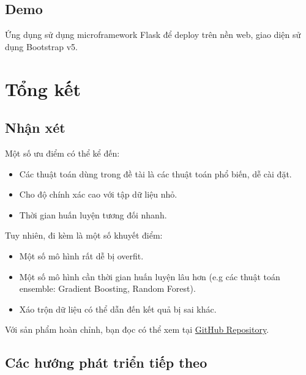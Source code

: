 \documentclass[12pt]{article}
\begin{document}
\subsection{Demo}
Ứng dụng sử dụng microframework Flask để deploy trên nền web, giao diện sử dụng Bootstrap v5.

\section{Tổng kết}
\subsection{Nhận xét}
Một số ưu điểm có thể kể đến:
\begin{itemize}
\item Các thuật toán dùng trong đề tài là các thuật toán phổ biến, dễ cài đặt.
\item Cho độ chính xác cao với tập dữ liệu nhỏ.
\item Thời gian huấn luyện tương đối nhanh.
\end{itemize}
Tuy nhiên, đi kèm là một số khuyết điểm:
\begin{itemize}
\item Một số mô hình rất dễ bị overfit.
\item Một số mô hình cần thời gian huấn luyện lâu hơn (e.g các thuật toán ensemble: Gradient Boosting, Random Forest).
\item Xáo trộn dữ liệu có thể dẫn đến kết quả bị sai khác.\cite{Kowsari_2019}
\end{itemize}
Với sản phẩm hoàn chỉnh, bạn đọc có thể xem tại \href{https://github.com/trhgquan/fakenews-detection}{GitHub Repository}.

\subsection{Các hướng phát triển tiếp theo}

\cleardoublepage
{}
{}


\end{document}
